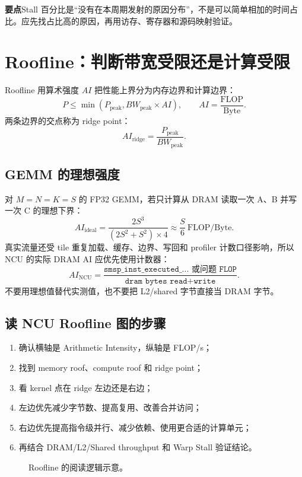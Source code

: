 \documentclass[UTF8,11pt,a4paper,fontset=fandol]{ctexart}
\newcommand{\takeaway}[1]{\par\noindent\colorbox{PaleBlue}{\parbox{\dimexpr\linewidth-2\fboxsep\relax}{\textbf{要点}\quad #1}}\par}
\newcommand{\pagebreakhere}{\clearpage}
\begin{document}
\takeaway{Stall 百分比是“没有在本周期发射的原因分布”，不是可以简单相加的时间占比。应先找占比高的原因，再用访存、寄存器和源码映射验证。}

\pagebreakhere
\section{Roofline：判断带宽受限还是计算受限}
Roofline 用算术强度 $AI$ 把性能上界分为内存边界和计算边界：
\begin{equation}
P\leq\min(P_{\mathrm{peak}}, BW_{\mathrm{peak}}\times AI),
\qquad AI=\frac{\mathrm{FLOP}}{\mathrm{Byte}}.
\end{equation}
两条边界的交点称为 ridge point：
\[
AI_{\mathrm{ridge}}=\frac{P_{\mathrm{peak}}}{BW_{\mathrm{peak}}}.
\]

\subsection{GEMM 的理想强度}
对 $M=N=K=S$ 的 FP32 GEMM，若只计算从 DRAM 读取一次 A、B 并写一次 C 的理想下界：
\[
AI_{\mathrm{ideal}}=\frac{2S^3}{(2S^2+S^2)\times4}
\approx\frac{S}{6}\ \mathrm{FLOP/Byte}.
\]
真实流量还受 tile 重复加载、缓存、边界、写回和 profiler 计数口径影响，所以 NCU 的实际 DRAM AI 应优先使用计数器：
\[
AI_{\mathrm{NCU}}=\frac{\texttt{smsp\_inst\_executed\_... 或问题 FLOP}}{\texttt{dram bytes read+write}}.
\]
不要用理想值替代实测值，也不要把 L2/shared 字节直接当 DRAM 字节。

\subsection{读 NCU Roofline 图的步骤}
\begin{enumerate}
  \item 确认横轴是 Arithmetic Intensity，纵轴是 FLOP/s；
  \item 找到 memory roof、compute roof 和 ridge point；
  \item 看 kernel 点在 ridge 左边还是右边；
  \item 左边优先减少字节数、提高复用、改善合并访问；
  \item 右边优先提高指令级并行、减少依赖、使用更合适的计算单元；
  \item 再结合 DRAM/L2/Shared throughput 和 Warp Stall 验证结论。
\end{enumerate}

\begin{figure}[H]\centering
{}
\caption{Roofline 的阅读逻辑示意。}
\end{figure}
\end{document}
